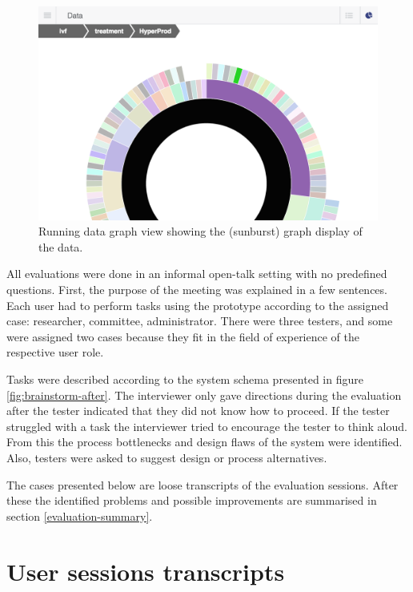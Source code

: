 \begin{figure}[ht]
	\centering
	\includegraphics[width=0.7\linewidth]{images/sunburst-closeup}
	\caption{
		Running \ivfsystem{} data graph view showing the (sunburst) graph display of the data.
	}
	\label{fig:sunburst-view-zoom-website}
\end{figure}

All evaluations were done in an informal open-talk setting with no predefined questions.
First, the purpose of the meeting was explained in a few sentences.
Each user had to perform tasks using the prototype according to the assigned case: researcher, committee, administrator.
There were three testers, and some were assigned two cases because they fit in the field of experience of the respective user role.

Tasks were described according to the system schema presented in figure \ref{fig:brainstorm-after}.
The interviewer only gave directions during the evaluation after the tester indicated that they did not know how to proceed.
If the tester struggled with a task the interviewer tried to encourage the tester to think aloud.
From this the process bottlenecks and design flaws of the system were identified.
Also, testers were asked to suggest design or process alternatives.

The  cases presented below are loose transcripts of the evaluation sessions.
After these the identified problems and possible improvements are summarised in section \ref{evaluation-summary}.

\section{User sessions transcripts}

